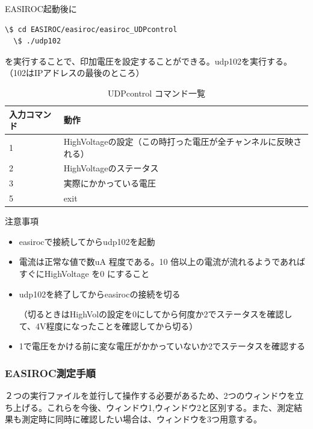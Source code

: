 EASIROC起動後に
\begin{lstlisting}[caption=印加電圧の設定]
  \$ cd EASIROC/easiroc/easiroc_UDPcontrol
  \$ ./udp102
\end{lstlisting}
を実行することで、印加電圧を設定することができる。udp102を実行する。（102はIPアドレスの最後のところ）
\begin{table}[htbp]
  \begin{center}
    \caption{UDPcontrol コマンド一覧}
    \begin{tabular}{|l|l|} \hline
      入力コマンド & 動作                                                            \\ \hline \hline
      1            & HighVoltageの設定（この時打った電圧が全チャンネルに反映される） \\ \hline
      2            & HighVoltageのステータス                                         \\ \hline
      3            & 実際にかかっている電圧                                          \\ \hline
      5            & exit                                                            \\ \hline
    \end{tabular}
  \end{center}
\end{table}

\begin{itembox}[l]{注意事項}
  \begin{itemize}
    \item easirocで接続してからudp102を起動
    \item 電流は正常な値で数uA 程度である。10 倍以上の電流が流れるようであればすぐにHighVoltage を0 にすること
    \item udp102を終了してからeasirocの接続を切る\par
          （切るときはHighVolの設定を0にしてから何度か2でステータスを確認して、4V程度になったことを確認してから切る）
    \item 1で電圧をかける前に変な電圧がかかっていないか2でステータスを確認する
  \end{itemize}
\end{itembox}

\subsubsection{EASIROC測定手順}

２つの実行ファイルを並行して操作する必要があるため、2つのウィンドウを立ち上げる。これらを今後、ウィンドウ1,ウィンドウ2と区別する。また、測定結果も測定時に同時に確認したい場合は、ウィンドウを3つ用意する。

